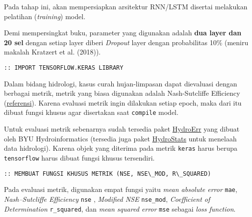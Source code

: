 \documentclass[11pt]{article}
\begin{document}
Pada tahap ini, akan mempersiapkan arsitektur RNN/LSTM disertai
melakukan pelatihan (\emph{training}) model.

Demi mempersingkat buku, parameter yang digunakan adalah \textbf{dua
layer dan 20 sel} dengan setiap layer diberi \emph{Dropout} layer dengan
probabilitas 10\% (meniru makalah Kratzert et al. (2018)).

    \begin{Verbatim}[commandchars=\\\{\}]
:: IMPORT TENSORFLOW.KERAS LIBRARY
    \end{Verbatim}

    Dalam bidang hidrologi, kasus curah hujan-limpasan dapat dievaluasi
dengan berbagai metrik, metrik yang biasa digunakan adalah
Nash-Sutcliffe Efficiency
(\href{https://en.wikipedia.org/wiki/Nash–Sutcliffe_model_efficiency_coefficient}{referensi}).
Karena evaluasi metrik ingin dilakukan setiap epoch, maka dari itu
dibuat fungsi khusus agar disertakan saat \texttt{compile} model.

Untuk evaluasi metrik sebenarnya sudah tersedia paket
\href{https://github.com/BYU-Hydroinformatics/HydroErr}{HydroErr} yang
dibuat oleh BYU Hydroinformatics (tersedia juga paket
\href{https://github.com/BYU-Hydroinformatics/Hydrostats}{HydroStats}
untuk menelaah data hidrologi). Karena objek yang diterima pada metrik
\texttt{keras} harus berupa \texttt{tensorflow} harus dibuat fungsi
khusus tersendiri.

    \begin{Verbatim}[commandchars=\\\{\}]
:: MEMBUAT FUNGSI KHUSUS METRIK (NSE, NSE\_MOD, R\_SQUARED)
    \end{Verbatim}

    Pada evaluasi metrik, digunakan empat fungsi yaitu \emph{mean absolute
error} \texttt{mae}, \emph{Nash--Sutcliffe Efficiency} \texttt{nse} ,
\emph{Modified NSE} \texttt{nse\_mod}, \emph{Coefficient of
Determination} \texttt{r\_squared}, dan \emph{mean squared error}
\texttt{mse} sebagai \emph{loss function}.
\end{document}
